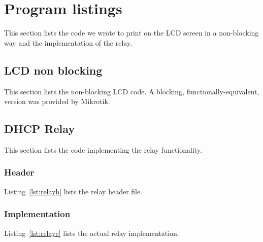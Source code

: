 \newpage
\section{Program listings}
This section lists the code we wrote to print on the LCD screen in a non-blocking way and the implementation of the relay.

\subsection{LCD non blocking}
This section lists the non-blocking LCD code. A blocking, functionally-equivalent, version was provided by Mikrotik.


\subsection{DHCP Relay}
This section lists the code implementing the relay functionality.

\subsubsection{Header}
Listing~\ref{lst:relayh} lists the relay header file.


\newpage
\subsubsection{Implementation}
Listing~\ref{lst:relayc} lists the actual relay implementation.

